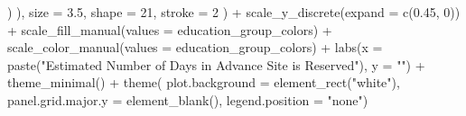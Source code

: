 \documentclass[
  11 pt,
  openany]{book}
\newenvironment{Shaded}{\begin{snugshade}}{\end{snugshade}}
\newcommand{\AttributeTok}[1]{\textcolor[rgb]{0.77,0.63,0.00}{#1}}
\newcommand{\DecValTok}[1]{\textcolor[rgb]{0.00,0.00,0.81}{#1}}
\newcommand{\FloatTok}[1]{\textcolor[rgb]{0.00,0.00,0.81}{#1}}
\newcommand{\FunctionTok}[1]{\textcolor[rgb]{0.00,0.00,0.00}{#1}}
\newcommand{\NormalTok}[1]{#1}
\newcommand{\SpecialCharTok}[1]{\textcolor[rgb]{0.00,0.00,0.00}{#1}}
\newcommand{\StringTok}[1]{\textcolor[rgb]{0.31,0.60,0.02}{#1}}
\begin{document}
\begin{Shaded}
\begin{Highlighting}[]
\NormalTok{      )}
\NormalTok{    ),}
    \AttributeTok{size =} \FloatTok{3.5}\NormalTok{, }\AttributeTok{shape =} \DecValTok{21}\NormalTok{, }\AttributeTok{stroke =} \DecValTok{2}\NormalTok{ ) }\SpecialCharTok{+}
  \FunctionTok{scale\_y\_discrete}\NormalTok{(}\AttributeTok{expand =} \FunctionTok{c}\NormalTok{(}\FloatTok{0.45}\NormalTok{, }\DecValTok{0}\NormalTok{)) }\SpecialCharTok{+}
  \FunctionTok{scale\_fill\_manual}\NormalTok{(}\AttributeTok{values =}\NormalTok{ education\_group\_colors) }\SpecialCharTok{+}
  \FunctionTok{scale\_color\_manual}\NormalTok{(}\AttributeTok{values =}\NormalTok{ education\_group\_colors) }\SpecialCharTok{+}
  \FunctionTok{labs}\NormalTok{(}\AttributeTok{x =} \FunctionTok{paste}\NormalTok{(}\StringTok{"Estimated Number of Days in Advance Site is Reserved"}\NormalTok{),}
       \AttributeTok{y =} \StringTok{""}\NormalTok{) }\SpecialCharTok{+}
  \FunctionTok{theme\_minimal}\NormalTok{() }\SpecialCharTok{+}
  \FunctionTok{theme}\NormalTok{(}
    \AttributeTok{plot.background =} \FunctionTok{element\_rect}\NormalTok{(}\StringTok{"white"}\NormalTok{),}
    \AttributeTok{panel.grid.major.y =} \FunctionTok{element\_blank}\NormalTok{(),}
    \AttributeTok{legend.position =} \StringTok{"none"}\NormalTok{)}


\end{Highlighting}
\end{Shaded}
\end{document}
